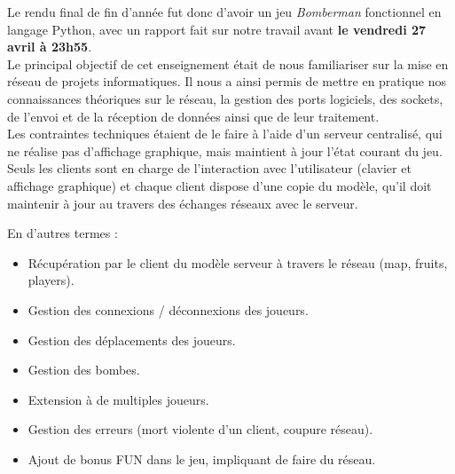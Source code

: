\documentclass[a4paper]{article}
\begin{document}
Le rendu final de fin d'année fut donc d'avoir un jeu \textit{Bomberman} fonctionnel en langage Python, avec un rapport fait sur notre travail avant \textbf{le vendredi 27 avril à 23h55}.
\\

Le principal objectif de cet enseignement était de nous familiariser sur la mise en réseau de projets informatiques.
Il nous a ainsi permis de mettre en pratique nos connaissances théoriques sur le réseau, la gestion des ports logiciels, des sockets, de l'envoi et de la réception de données ainsi que de leur traitement.
\\

Les contraintes techniques étaient de le faire à l'aide d'un serveur centralisé, qui ne réalise pas d'affichage graphique, mais maintient à jour l'état courant du jeu.
Seuls les clients sont en charge de l'interaction avec l'utilisateur (clavier et affichage graphique) et chaque client dispose d'une copie du modèle, qu'il doit maintenir à jour au travers des échanges réseaux avec le serveur.

	En d'autres termes :
	\begin{itemize}
\item Récupération par le client du modèle serveur à travers le réseau (map, fruits, players).
\item Gestion des connexions / déconnexions des joueurs.
\item Gestion des déplacements des joueurs.
\item Gestion des bombes.
\item Extension à de multiples joueurs.
\item Gestion des erreurs (mort violente d'un client, coupure réseau).
\item Ajout de bonus FUN dans le jeu, impliquant de faire du réseau.
	\end{itemize}

\end{document}
